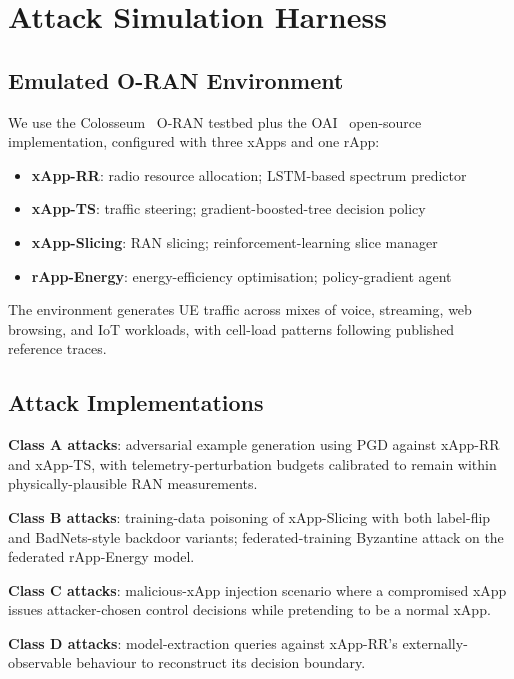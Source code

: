 \documentclass[sigconf,nonacm]{acmart}
\begin{document}
\section{Attack Simulation Harness}

\subsection{Emulated O-RAN Environment}

We use the Colosseum~\cite{bonati2021colosseum} O-RAN testbed
plus the OAI~\cite{oai2024} open-source implementation, configured
with three xApps and one rApp:

\begin{itemize}
  \item \textbf{xApp-RR}: radio resource allocation; LSTM-based
        spectrum predictor
  \item \textbf{xApp-TS}: traffic steering; gradient-boosted-tree
        decision policy
  \item \textbf{xApp-Slicing}: RAN slicing; reinforcement-learning
        slice manager
  \item \textbf{rApp-Energy}: energy-efficiency optimisation;
        policy-gradient agent
\end{itemize}

The environment generates UE traffic across mixes of voice,
streaming, web browsing, and IoT workloads, with cell-load
patterns following published reference traces.

\subsection{Attack Implementations}

\textbf{Class A attacks}: adversarial example generation using
PGD against xApp-RR and xApp-TS, with telemetry-perturbation
budgets calibrated to remain within physically-plausible RAN
measurements.

\textbf{Class B attacks}: training-data poisoning of xApp-Slicing
with both label-flip and BadNets-style backdoor variants;
federated-training Byzantine attack on the federated rApp-Energy
model.

\textbf{Class C attacks}: malicious-xApp injection scenario where a
compromised xApp issues attacker-chosen control decisions while
pretending to be a normal xApp.

\textbf{Class D attacks}: model-extraction queries against
xApp-RR's externally-observable behaviour to reconstruct its
decision boundary.
\end{document}
